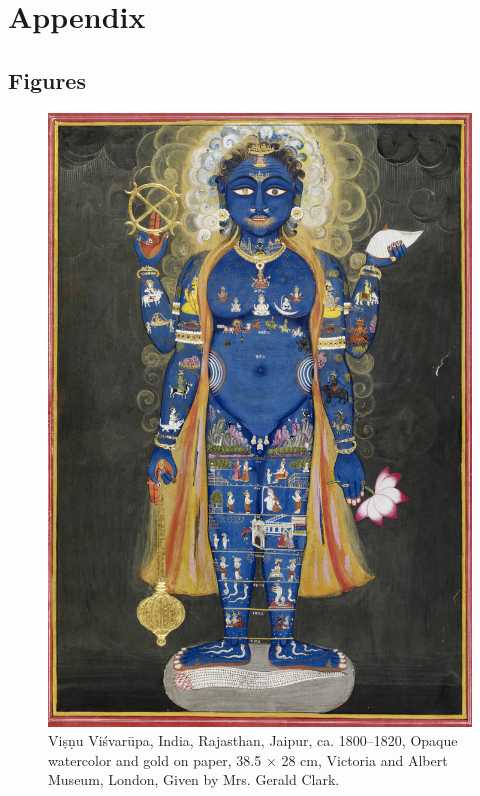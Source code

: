 \backmatter
\chapter{Appendix}
\section{Figures}

\clearpage
  \begin{figure}[ht]
	\centering
  \includegraphics[width=1\textwidth]{pics/Vishnu_Vishvarupa_cropped.jpg}
	\caption{Viṣṇu Viśvarūpa, India, Rajasthan, Jaipur, ca. 1800–1820, Opaque watercolor and gold on paper, 38.5 × 28 cm, Victoria and Albert Museum, London, Given by Mrs. Gerald Clark.}
	\label{fig1}
      \end{figure}
